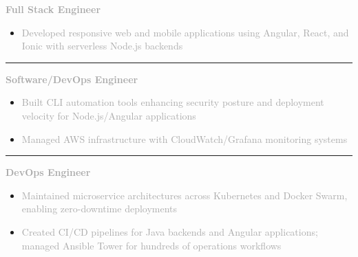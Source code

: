 \documentclass[10pt,letterpaper]{article}
\newcommand{\companyHeader}[2]{%
    \vspace{5pt}
    \noindent\textcolor{#2}{\rule{3pt}{10pt}}\hspace{6pt}{\headingfont\normalsize\textbf{\textcolor{darkgray}{#1}}}
    \vspace{2pt}
}
\newcommand{\positionHeader}[2]{%
    \noindent\textbf{\textcolor{darkgray}{#2}}\hspace{4pt}{\footnotesize\textcolor{mediumgray}{//}}\hspace{4pt}{\footnotesize\itshape\textcolor{mediumgray}{#1}}
    \vspace{1pt}
}
\begin{document}
\begin{minipage}[t][10.5in][t]{5.3in}
\begin{minipage}{4.7in}
\vspace{2pt}

\positionHeader{2022}{Full Stack Engineer}
\begin{itemize}
    \setlength\itemsep{1pt}
    \item\small\textcolor{darkgray}{Developed responsive web and mobile applications using Angular, React, and Ionic with serverless Node.js backends}
\end{itemize}

\companyHeader{Triblio}{company2}

\positionHeader{2021 – 2022}{Software/DevOps Engineer}
\begin{itemize}
    \setlength\itemsep{1pt}
    \item\small\textcolor{darkgray}{Built CLI automation tools enhancing security posture and deployment velocity for Node.js/Angular applications}
    \item\small\textcolor{darkgray}{Managed AWS infrastructure with CloudWatch/Grafana monitoring systems}
\end{itemize}

\companyHeader{Accenture Federal Services}{company3}

\positionHeader{2018 – 2021}{DevOps Engineer}
\begin{itemize}
    \setlength\itemsep{1pt}
    \item\small\textcolor{darkgray}{Maintained microservice architectures across Kubernetes and Docker Swarm, enabling zero-downtime deployments}
    \item\small\textcolor{darkgray}{Created CI/CD pipelines for Java backends and Angular applications; managed Ansible Tower for hundreds of operations workflows}
\end{itemize}

\end{minipage}
\end{minipage}
\end{document}
